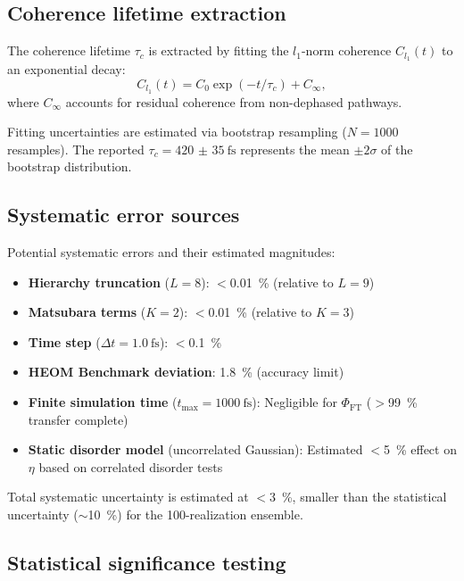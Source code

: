 \documentclass[11pt,a4paper]{article}
\begin{document}
\subsection{Coherence lifetime extraction}

The coherence lifetime $\tau_c$ is extracted by fitting the $l_1$-norm coherence $C_{l_1}(t)$ to an exponential decay:
\begin{equation}
C_{l_1}(t) = C_0 \exp(-t/\tau_c) + C_{\infty},
\label{eq:coherence_fit}
\end{equation}
where $C_{\infty}$ accounts for residual coherence from non-dephased pathways.

Fitting uncertainties are estimated via bootstrap resampling ($N = \num{1000}$ resamples). The reported $\tau_c = \SI{420(35)}{\femto\second}$ represents the mean $\pm 2\sigma$ of the bootstrap distribution.

\subsection{Systematic error sources}

Potential systematic errors and their estimated magnitudes:
\begin{itemize}
    \item \textbf{Hierarchy truncation} ($L = 8$): $<$\SI{0.01}{\percent} (relative to $L=9$)
    \item \textbf{Matsubara terms} ($K = 2$): $<$\SI{0.01}{\percent} (relative to $K=3$)
    \item \textbf{Time step} ($\Delta t = \SI{1.0}{\femto\second}$): $<$\SI{0.1}{\percent}
    \item \textbf{HEOM Benchmark deviation}: \SI{1.8}{\percent} (accuracy limit)
    \item \textbf{Finite simulation time} ($t_{\max} = \SI{1000}{\femto\second}$): Negligible for $\Phi_{\mathrm{FT}}$ ($>$\SI{99}{\percent} transfer complete)
    \item \textbf{Static disorder model} (uncorrelated Gaussian): Estimated $<$\SI{5}{\percent} effect on $\eta$ based on correlated disorder tests
\end{itemize}

Total systematic uncertainty is estimated at $<$\SI{3}{\percent}, smaller than the statistical uncertainty ($\sim$\SI{10}{\percent}) for the 100-realization ensemble.

\subsection{Statistical significance testing}
\end{document}
